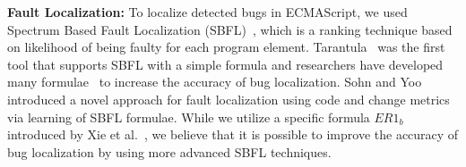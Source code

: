 \textbf{Fault Localization:} To localize detected bugs in ECMAScript, we used
Spectrum Based Fault Localization (SBFL)~\cite{sbfl-survey}, which is a ranking
technique based on likelihood of being faulty for each program element.
Tarantula~\cite{tarantula, tarantula2} was the first tool that supports SBFL
with a simple formula and researchers have developed many formulae~\cite{ample, zoltar,
sbfl-model, effect-sbfl} to increase the accuracy of bug localization.
Sohn and Yoo~\cite{fluccs} introduced a novel approach for fault
localization using code and change metrics via learning of SBFL formulae.
While we utilize a specific formula $ER1_b$ introduced by Xie et al.~\cite{er1b}, we
believe that it is possible to improve the accuracy of bug localization by
using more advanced SBFL techniques.


